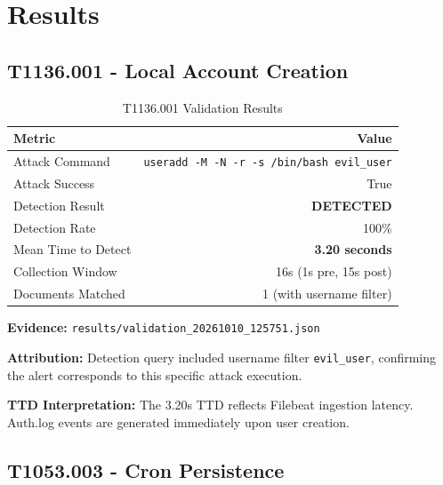\documentclass[11pt,a4paper]{article}
\begin{document}
\section{Results}

\subsection{T1136.001 - Local Account Creation}

\begin{table}[H]
    \centering
    \caption{T1136.001 Validation Results}
    \begin{tabular}{lr}
        \toprule
        \textbf{Metric} & \textbf{Value} \\
        \midrule
        Attack Command & \texttt{useradd -M -N -r -s /bin/bash evil\_user} \\
        Attack Success & True \\
        Detection Result & \textbf{DETECTED} \\
        Detection Rate & 100\% \\
        Mean Time to Detect & \textbf{3.20 seconds} \\
        Collection Window & 16s (1s pre, 15s post) \\
        Documents Matched & 1 (with username filter) \\
        \bottomrule
    \end{tabular}
\end{table}

\textbf{Evidence:} \texttt{results/validation\_20261010\_125751.json}

\textbf{Attribution:} Detection query included username filter \texttt{evil\_user}, confirming the alert corresponds to this specific attack execution.

\textbf{TTD Interpretation:} The 3.20s TTD reflects Filebeat ingestion latency. Auth.log events are generated immediately upon user creation.

\subsection{T1053.003 - Cron Persistence}
\end{document}
